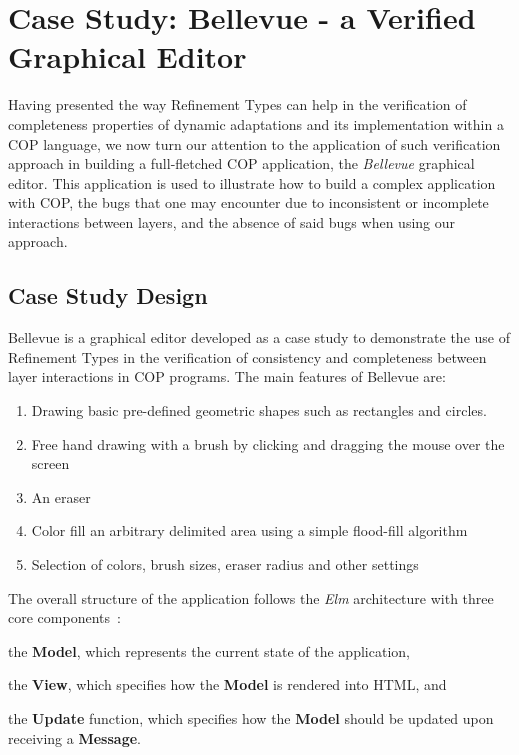 

\section{Case Study: Bellevue - a Verified Graphical Editor}
\label{sec:case-study}

Having presented the way Refinement Types can help in the verification of completeness properties of 
dynamic adaptations and its implementation within a \ac{COP} language, we now turn our attention to 
the application of such verification approach in building a full-fletched \ac{COP} application, the 
\emph{Bellevue} graphical editor.
This application is used to illustrate how to build a complex application with \ac{COP}, the bugs that 
one may encounter due to inconsistent or incomplete interactions between layers, and the absence of 
said bugs when using our approach.


\subsection{Case Study Design}
\label{sec:design}

Bellevue is a graphical editor developed as a case study to demonstrate the use of Refinement Types 
in the verification of consistency and completeness between layer interactions in \ac{COP} programs.
The main features of Bellevue are:

\begin{enumerate}
  \item Drawing basic pre-defined geometric shapes such as rectangles and circles.
  \item Free hand drawing with a brush by clicking and dragging the mouse over the screen
  \item An eraser
  \item Color fill an arbitrary delimited area using a simple flood-fill algorithm
  \item Selection of colors, brush sizes, eraser radius and other settings
\end{enumerate}

The overall structure of the application follows the \emph{Elm} architecture with three core 
components~\cite{ElmLang25}:
\begin{enumerate*}[label=(\arabic*)]
  \item the \textbf{Model}, which represents the current state of the application,
  \item the \textbf{View}, which specifies how the \textbf{Model} is rendered into HTML, and
  \item the \textbf{Update} function, which specifies how the \textbf{Model} should be updated upon receiving a \textbf{Message}.
\end{enumerate*}

